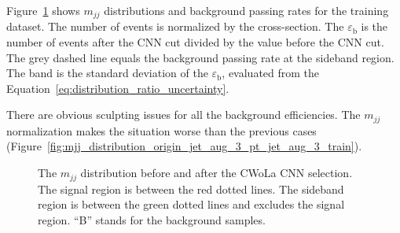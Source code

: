 \documentclass[12pt]{article}
\begin{document}
            Figure~\ref{fig:mjj_distribution_mjj_normalized_origin_train} shows $m_{jj}$ distributions and background passing rates for the training dataset. The number of events is normalized by the cross-section. The $\varepsilon_{\text{b}}$ is the number of events after the CNN cut divided by the value before the CNN cut. The grey dashed line equals the background passing rate at the sideband region. The band is the standard deviation of the $\varepsilon_{\text{b}}$, evaluated from the Equation~\ref{eq:distribution_ratio_uncertainty}.

            There are obvious sculpting issues for all the background efficiencies. The $m_{jj}$ normalization makes the situation worse than the previous cases (Figure~\ref{fig:mjj_distribution_origin_jet_aug_3_pt_jet_aug_3_train}).
            \begin{figure}[htpb]
                \centering
                \caption{The $m_{jj}$ distribution before and after the CWoLa CNN selection. The signal region is between the red dotted lines. The sideband region is between the green dotted lines and excludes the signal region. ``B'' stands for the background samples.}
                \label{fig:mjj_distribution_mjj_normalized_origin_train}
            \end{figure}
\end{document}
